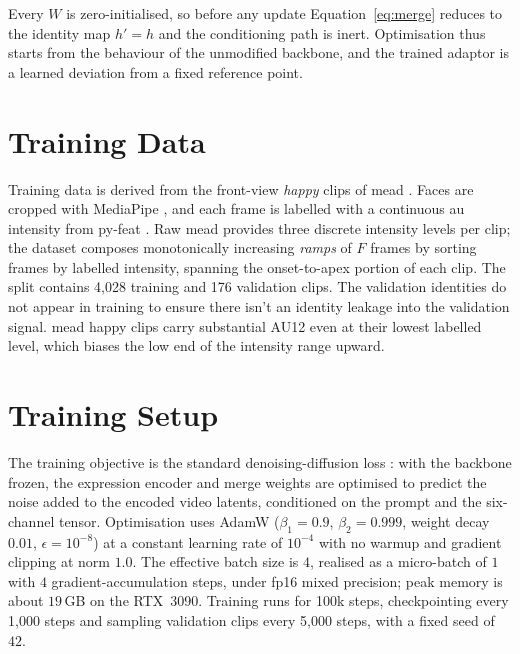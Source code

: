 Every $W$ is zero-initialised, so before any update Equation~\ref{eq:merge} reduces to the
identity map $h' = h$ and the conditioning path is inert. Optimisation thus starts from the
behaviour of the unmodified backbone, and the trained adaptor is a learned deviation from
a fixed reference point.

\section{Training Data}\label{sec:method-data}

Training data is derived from the front-view \emph{happy} clips of \gls{mead}
\citep{wang2020mead}. Faces are cropped with MediaPipe \citep{lugaresi2019mediapipe}, and
each frame is labelled with a continuous \gls{au} intensity from py-feat
\citep{cheong2023pyfeat}. Raw \gls{mead} provides three discrete intensity levels per
clip; the dataset composes monotonically increasing \emph{ramps} of $F$ frames by sorting frames by labelled intensity, spanning the onset-to-apex portion of each clip. The split contains
4{,}028 training and 176 validation clips. The validation identities do not appear in training to ensure there isn't an identity leakage into the validation signal. \gls{mead} happy clips carry substantial AU12 even at their lowest labelled level, which biases the low end of the intensity range upward.

\section{Training Setup}\label{sec:method-training}

The training objective is the standard denoising-diffusion loss \citep{ho2020ddpm}: with
the backbone frozen, the expression encoder and merge weights are optimised to predict the
noise added to the encoded video latents, conditioned on the prompt and the six-channel
tensor. Optimisation uses AdamW ($\beta_1=0.9$, $\beta_2=0.999$, weight decay $0.01$,
$\epsilon=10^{-8}$) at a constant learning rate of $10^{-4}$ with no warmup and gradient
clipping at norm $1.0$. The effective batch size is $4$, realised as a micro-batch of $1$
with $4$ gradient-accumulation steps, under fp16 mixed precision; peak memory is about
$19$\,GB on the RTX~3090. Training runs for 100k steps, checkpointing every 1{,}000 steps
and sampling validation clips every 5{,}000 steps, with a fixed seed
of $42$.

